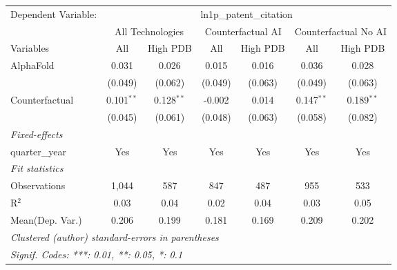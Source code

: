 \begingroup
\centering
\begin{tabular}{lcccccc}
   \tabularnewline \midrule \midrule
   Dependent Variable: & \multicolumn{6}{c}{ln1p\_patent\_citation}\\
 & \multicolumn{2}{c}{All Technologies} & \multicolumn{2}{c}{Counterfactual AI} & \multicolumn{2}{c}{Counterfactual No AI} \\
\cmidrule(lr){1-1}\cmidrule(lr){2-3} \cmidrule(lr){4-5} \cmidrule(lr){6-7}
Variables & \multicolumn{1}{c}{All} & \multicolumn{1}{c}{High PDB} & \multicolumn{1}{c}{All} & \multicolumn{1}{c}{High PDB} & \multicolumn{1}{c}{All} & \multicolumn{1}{c}{High PDB} \\
\cmidrule(lr){1-1}\cmidrule(lr){2-2} \cmidrule(lr){3-3} \cmidrule(lr){4-4} \cmidrule(lr){5-5} \cmidrule(lr){6-6} \cmidrule(lr){7-7}
   AlphaFold      & 0.031        & 0.026        & 0.015   & 0.016   & 0.036        & 0.028\\   
                  & (0.049)      & (0.062)      & (0.049) & (0.063) & (0.049)      & (0.063)\\   
   Counterfactual & 0.101$^{**}$ & 0.128$^{**}$ & -0.002  & 0.014   & 0.147$^{**}$ & 0.189$^{**}$\\   
                  & (0.045)      & (0.061)      & (0.048) & (0.063) & (0.058)      & (0.082)\\   
   \midrule
   \emph{Fixed-effects}\\
   quarter\_year  & Yes          & Yes          & Yes     & Yes     & Yes          & Yes\\  
   \midrule
   \emph{Fit statistics}\\
   Observations   & 1,044        & 587          & 847     & 487     & 955          & 533\\  
   R$^2$          & 0.03         & 0.04         & 0.02    & 0.04    & 0.03         & 0.05\\  
Mean(Dep. Var.) & 0.206 & 0.199 & 0.181 & 0.169 & 0.209 & 0.202 \\
   \midrule \midrule
   \multicolumn{7}{l}{\emph{Clustered (author) standard-errors in parentheses}}\\
   \multicolumn{7}{l}{\emph{Signif. Codes: ***: 0.01, **: 0.05, *: 0.1}}\\
\end{tabular}
\par\endgroup
